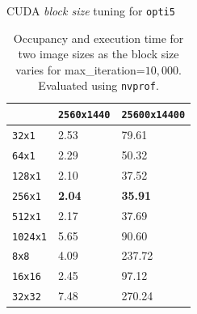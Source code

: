 \documentclass[10pt]{beamer}
\begin{document}
\begin{frame}{CUDA \textit{block size} tuning for \texttt{opti5}}
\begin{table}[H]
\begin{subtable}{.38\linewidth}
\begin{tabular}{|l|l|l|}
			\cline{2-3}
			& \texttt{2560x1440} & \texttt{25600x14400} \\ [0.2ex] 
			\hline\hline
			\texttt{32x1} & 2.53 & 79.61 \\ 
			\texttt{64x1} & 2.29 & 50.32 \\
			\texttt{128x1} & 2.10 & 37.52 \\
			\texttt{256x1} & \textbf{2.04} & \textbf{35.91} \\
			\texttt{512x1} & 2.17 & 37.69 \\
			\texttt{1024x1} & 5.65 & 90.60 \\
			\texttt{8x8} & 4.09 & 237.72 \\
			\texttt{16x16} & 2.45 & 97.12 \\
			\texttt{32x32} & 7.48 & 270.24 \\ [0.2ex] 
			\hline
		\end{tabular}
	\end{subtable} 
	\caption{Occupancy and execution time for two image sizes as the block size varies for max\_iteration=$10,000$. Evaluated using \texttt{nvprof}.}
\end{table}

\end{frame}
\end{document}
